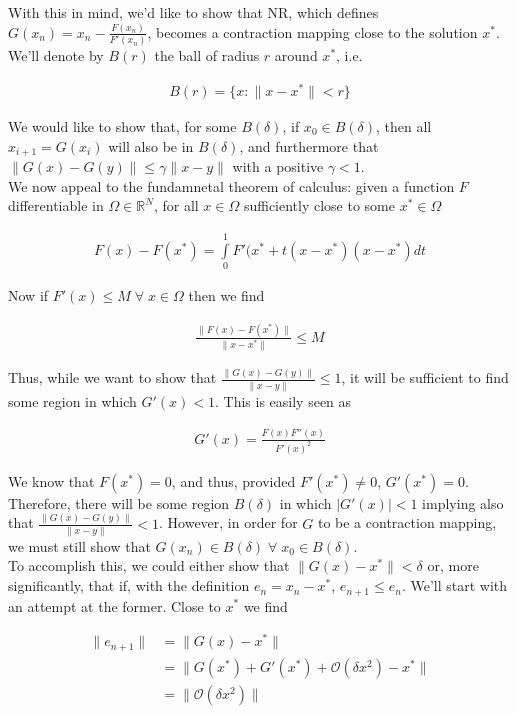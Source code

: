 \documentclass[11pt]{article}
\newcommand{\Forall}{\; \forall \;}
\begin{document}
With this in mind, we'd like to show that NR, which defines $G(x_n) = x_n - \frac{F(x_n)}{F'(x_n)}$, becomes a contraction mapping close to the solution $x^*$. We'll denote by $B(r)$ the ball of radius $r$ around $x^*$, i.e.

\begin{align*}
  B(r) = \{ x: \| x - x^* \| < r \}
\end{align*}

We would like to show that, for some $B(\delta)$, if $x_0 \in B(\delta)$, then all $x_{i+1} = G(x_i)$ will also be in $B(\delta)$, and furthermore that $\| G(x) - G(y) \| \leq \gamma \| x - y \|$ with a positive $\gamma < 1$. \\

We now appeal to the fundamnetal theorem of calculus: given a function $F$ differentiable in $\Omega \in \mathbb{R}^N$, for all $x \in \Omega$ sufficiently close to some $x^* \in \Omega$

\begin{align*}
  F(x) - F(x^*) = \int \limits_0^1 F'(x^* + t(x - x^*)(x - x^*)dt
\end{align*}

Now if $F'(x) \leq M \Forall x \in \Omega$ then we find

\begin{align*}
  \frac{\|F(x) - F(x^*)\|}{\|x - x^*\|} \leq M
\end{align*}

Thus, while we want to show that $\frac{\| G(x) - G(y) \|}{\| x - y \|} \leq 1$, it will be sufficient to find some region in which $G'(x) < 1$. This is easily seen as

\begin{align*}
  G'(x) = \frac{F(x)F''(x)}{F'(x)^2}
\end{align*}

We know that $F(x^*) = 0$, and thus, provided $F'(x^*) \neq 0$, $G'(x^*) = 0$. Therefore, there will be some region $B(\delta)$ in which $|G'(x)| < 1$ implying also that $\frac{\| G(x) - G(y) \|}{\| x - y \|} < 1$. However, in order for $G$ to be a contraction mapping, we must still show that $G(x_n) \in B(\delta) \Forall x_0 \in B(\delta)$. \\

To accomplish this, we could either show that $\| G(x) - x^* \| < \delta$ or, more significantly, that if, with the definition $e_n = x_n - x^*$, $e_{n+1} \leq e_n$. We'll start with an attempt at the former. Close to $x^*$ we find

\begin{align*}
  \| e_{n+1} \| &= \| G(x) - x^* \| \\
  &= \| G(x^*) + G'(x^*) + \mathcal{O}(\delta x^2) - x^* \| \\
  &= \| \mathcal{O}(\delta x^2) \|
\end{align*}
\end{document}
